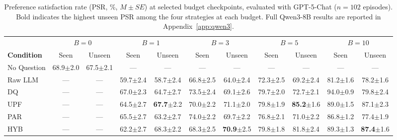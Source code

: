 \documentclass[manuscript,review,anonymous]{acmart}
\begin{document}
{\begin{table}[t]
\centering
\caption{Preference satisfaction rate (PSR, \%, $M \pm SE$) at selected budget checkpoints, evaluated with GPT-5-Chat ($n=102$ episodes). Bold indicates the highest unseen PSR among the four strategies at each budget. Full Qwen3-8B results are reported in Appendix~\ref{app:qwen3}.}
\label{tab:study1-results}
\begin{tabular}{l cc cc cc cc cc}
\toprule
 & \multicolumn{2}{c}{$B=0$} & \multicolumn{2}{c}{$B=1$} & \multicolumn{2}{c}{$B=3$} & \multicolumn{2}{c}{$B=5$} & \multicolumn{2}{c}{$B=10$} \\
\cmidrule(lr){2-3} \cmidrule(lr){4-5} \cmidrule(lr){6-7} \cmidrule(lr){8-9} \cmidrule(lr){10-11}
\textbf{Condition} & Seen & Unseen & Seen & Unseen & Seen & Unseen & Seen & Unseen & Seen & Unseen \\
\midrule
No Question & 68.9{\scriptsize$\pm$2.0} & 67.5{\scriptsize$\pm$2.1} & --- & --- & --- & --- & --- & --- & --- & --- \\
Raw LLM     & --- & --- & 59.7{\scriptsize$\pm$2.4} & 58.7{\scriptsize$\pm$2.4} & 66.8{\scriptsize$\pm$2.5} & 64.0{\scriptsize$\pm$2.4} & 72.3{\scriptsize$\pm$2.5} & 69.2{\scriptsize$\pm$2.4} & 81.2{\scriptsize$\pm$1.6} & 78.2{\scriptsize$\pm$1.6} \\
\midrule
DQ          & --- & --- & 67.0{\scriptsize$\pm$2.3} & 64.7{\scriptsize$\pm$2.7} & 73.5{\scriptsize$\pm$2.4} & 69.1{\scriptsize$\pm$2.6} & 79.7{\scriptsize$\pm$2.0} & 72.7{\scriptsize$\pm$2.1} & 94.0{\scriptsize$\pm$0.9} & 79.8{\scriptsize$\pm$2.4} \\
UPF         & --- & --- & 64.5{\scriptsize$\pm$2.7} & \textbf{67.7}{\scriptsize$\pm$2.2} & 70.0{\scriptsize$\pm$2.2} & 71.1{\scriptsize$\pm$2.0} & 79.8{\scriptsize$\pm$1.9} & \textbf{85.2}{\scriptsize$\pm$1.6} & 89.0{\scriptsize$\pm$1.5} & 87.1{\scriptsize$\pm$2.3} \\
PAR         & --- & --- & 65.5{\scriptsize$\pm$2.7} & 63.2{\scriptsize$\pm$2.7} & 74.0{\scriptsize$\pm$2.2} & 69.7{\scriptsize$\pm$2.2} & 76.8{\scriptsize$\pm$2.1} & 71.0{\scriptsize$\pm$2.2} & 86.8{\scriptsize$\pm$1.2} & 77.4{\scriptsize$\pm$1.9} \\
HYB         & --- & --- & 62.2{\scriptsize$\pm$2.7} & 68.3{\scriptsize$\pm$2.2} & 68.3{\scriptsize$\pm$2.5} & \textbf{70.9}{\scriptsize$\pm$2.5} & 79.8{\scriptsize$\pm$1.8} & 81.8{\scriptsize$\pm$2.4} & 89.3{\scriptsize$\pm$1.3} & \textbf{87.4}{\scriptsize$\pm$1.6} \\
\bottomrule
\end{tabular}
\end{table}

}
\end{document}
